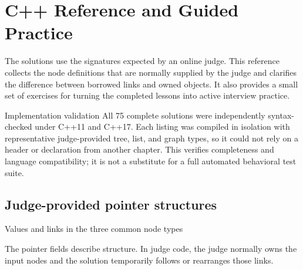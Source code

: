 
\clearpage
{}
\section*{C++ Reference and Guided Practice}

The solutions use the signatures expected by an online judge. This reference
collects the node definitions that are normally supplied by the judge and
clarifies the difference between borrowed links and owned objects. It also
provides a small set of exercises for turning the completed lessons into
active interview practice.

\begin{conceptbox}{Implementation validation}
All 75 complete solutions were independently syntax-checked under C++11 and
C++17. Each listing was compiled in isolation with representative
judge-provided tree, list, and graph types, so it could not rely on a header or
declaration from another chapter. This verifies completeness and language
compatibility; it is not a substitute for a full automated behavioral test
suite.
\end{conceptbox}

\subsection{Judge-provided pointer structures}

\begin{visualbox}{Values and links in the three common node types}
\centering
{}

\smallskip
The pointer fields describe structure. In judge code, the judge normally owns
the input nodes and the solution temporarily follows or rearranges those links.
\end{visualbox}

